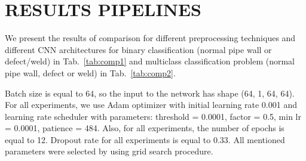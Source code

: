 \section{RESULTS PIPELINES}
\label{RESULTS PIPELINES}

We present the results of comparison for different preprocessing techniques and different CNN architectures for binary classification (normal pipe wall or defect/weld) in Tab.~\ref{tab:comp1} and multiclass classification problem (normal pipe wall, defect or weld) in Tab.~\ref{tab:comp2}.

Batch size is equal to 64, so the input to the network has shape (64, 1, 64, 64).
For all experiments, we use Adam optimizer with initial learning rate 0.001 and learning rate scheduler with parameters: threshold = 0.0001, factor = 0.5, min lr = 0.0001, patience = 484.
Also, for all experiments, the number of epochs is equal to 12.
Dropout rate for all experiments is equal to 0.33.
All mentioned parameters were selected by using grid search procedure.

